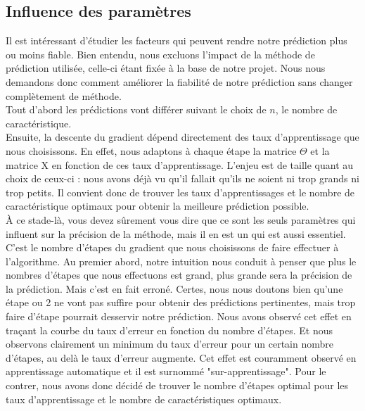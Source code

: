\documentclass[a4paper,10pt]{article}
\begin{document}
\subsection{Influence des paramètres}

Il est intéressant d'étudier les facteurs qui peuvent rendre notre prédiction plus ou moins fiable. Bien entendu, nous excluons l'impact de la méthode de prédiction utilisée, celle-ci étant fixée à la base de notre projet. Nous nous demandons donc comment améliorer la fiabilité de notre prédiction sans changer complètement de méthode.\\

Tout d'abord les prédictions vont différer suivant le choix de $n$, le nombre de caractéristique.\\
Ensuite, la descente du gradient dépend directement des taux d'apprentissage que nous choisissons. En effet, nous adaptons à chaque étape la matrice $\Theta$ et la matrice X en fonction de ces taux d'apprentissage. L'enjeu est de taille quant au choix de ceux-ci : nous avons déjà vu qu'il fallait qu'ils ne soient ni trop grands ni trop petits. Il convient donc de trouver les taux d'apprentissages et le nombre de caractéristique optimaux pour obtenir la meilleure prédiction possible.\\
À ce stade-là, vous devez sûrement vous dire que ce sont les seuls paramètres qui influent sur la précision de la méthode, mais il en est un qui est aussi essentiel. C'est le nombre d'étapes du gradient que nous choisissons de faire effectuer à l'algorithme. Au premier abord, notre intuition nous conduit à penser que plus le nombres d'étapes que nous effectuons est grand, plus grande sera la précision de la prédiction. Mais c'est en fait erroné. Certes, nous nous doutons bien qu'une étape ou 2 ne vont pas suffire pour obtenir des prédictions pertinentes, mais trop faire d'étape pourrait desservir notre prédiction. Nous avons observé cet effet en traçant la courbe du taux d'erreur en fonction du nombre d'étapes. Et nous observons clairement un minimum du taux d'erreur pour un certain nombre d'étapes, au delà le taux d'erreur augmente. Cet effet est couramment observé en apprentissage automatique et il est surnommé "sur-apprentissage". Pour le contrer, nous avons donc décidé de trouver le nombre d'étapes optimal pour les taux d'apprentissage et le nombre de caractéristiques optimaux.

\end{document}
